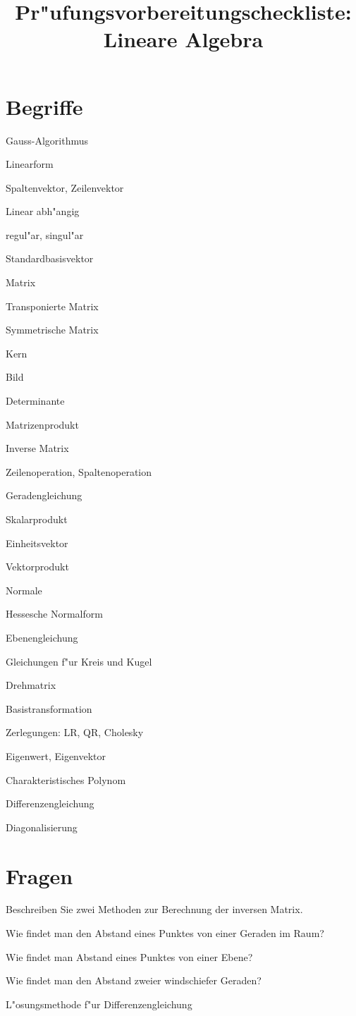 \documentclass[a4paper,12pt,twocolumn]{article}
\begin{document}
\title{Pr"ufungsvorbereitungscheckliste:\\ Lineare Algebra}
\date{}
\maketitle
\section{Begriffe}
\begin{compactenum}
\item Gauss-Algorithmus
\item Linearform
\item Spaltenvektor, Zeilenvektor
\item Linear abh"angig
\item regul"ar, singul"ar
\item Standardbasisvektor
\item Matrix
\item Transponierte Matrix
\item Symmetrische Matrix
\item Kern
\item Bild
\item Determinante
\item Matrizenprodukt
\item Inverse Matrix
\item Zeilenoperation, Spaltenoperation
\item Geradengleichung
\item Skalarprodukt
\item Einheitsvektor
\item Vektorprodukt
\item Normale
\item Hessesche Normalform
\item Ebenengleichung
\item Gleichungen f"ur Kreis und Kugel
\item Drehmatrix
\item Basistransformation
\item Zerlegungen: LR, QR, Cholesky
\item Eigenwert, Eigenvektor
\item Charakteristisches Polynom
\item Differenzengleichung
\item Diagonalisierung
\end{compactenum}
\vfill
\section{Fragen}
\begin{compactenum}
\item Beschreiben Sie zwei Methoden zur Berechnung der inversen Matrix.
\item Wie findet man den Abstand eines Punktes von einer Geraden im Raum?
\item Wie findet man Abstand eines Punktes von einer Ebene?
\item Wie findet man den Abstand zweier windschiefer Geraden?
\item L"osungsmethode f"ur Differenzengleichung
\end{compactenum}
\end{document}
